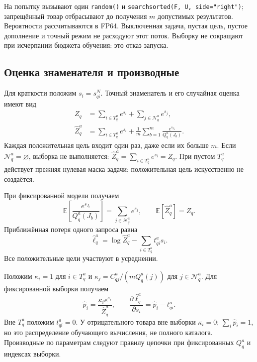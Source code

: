 \documentclass[12pt,a4paper]{article}
\newcommand{\code}[1]{{\ttfamily\small\nolinkurl{#1}}}
\newcommand{\E}{\mathbb E}
\theoremstyle{plainru}
\begin{document}
На попытку вызывают один \code{random()} и
\code{searchsorted(F, U, side="right")};
запрещённый товар отбрасывают до получения $m$ допустимых результатов.
Вероятности рассчитываются в FP64. Выключенная задача, пустая цель,
пустое дополнение и точный режим не расходуют этот поток.
Выборку не сокращают при исчерпании бюджета обучения: это отказ запуска.

\subsection{Оценка знаменателя и производные}
\label{sec:sampled-loss}

Для краткости положим $s_i=s_{qi}^{N}$.
Точный знаменатель и его случайная оценка имеют вид
\begin{align}\label{eq:sampled-normalizer}
Z_q&=\sum_{i\in T_q^a}e^{s_i}
       +\sum_{j\in\mathcal N_q^a}e^{s_j},\\
\widehat Z_q^a&=\sum_{i\in T_q^a}e^{s_i}
       +\frac1m\sum_{b=1}^{m}
        \frac{e^{s_{J_b}}}{Q_q^a(J_b)}.
\nonumber
\end{align}
Каждая положительная цель входит один раз, даже если их больше $m$.
Если $\mathcal N_q^a=\varnothing$, выборка не выполняется:
$\widehat Z_q^a=\sum_{i\in T_q^a}e^{s_i}=Z_q$.
При пустом $T_q^a$ действует прежняя нулевая маска задачи;
положительная цель искусственно не создаётся.

При фиксированной модели получаем
\begin{equation}\label{eq:sampled-unbiased-normalizer}
\E\!\left[\frac{e^{s_{J_b}}}{Q_q^a(J_b)}\right]
=\sum_{j\in\mathcal N_q^a}e^{s_j},
\qquad
\E[\widehat Z_q^a]=Z_q.
\end{equation}
Приближённая потеря одного запроса равна
\begin{equation}\label{eq:sampled-query-loss}
\widehat\ell_q^a
=\log\widehat Z_q^a-\sum_{i\in T_q^a}t_{qi}^a s_i.
\end{equation}
Все положительные цели участвуют в усреднении.

Положим $\kappa_i=1$ для $i\in T_q^a$ и
$\kappa_j=C_{qj}^a/(mQ_q^a(j))$ для $j\in\mathcal N_q^a$.
Для фиксированной выборки получаем
\begin{equation}\label{eq:sampled-gradient}
\widehat p_i=\frac{\kappa_i e^{s_i}}{\widehat Z_q^a},
\qquad
\frac{\partial\widehat\ell_q^a}{\partial s_i}
=\widehat p_i-t_{qi}^a.
\end{equation}
Вне $T_q^a$ положим $t_{qi}^a=0$. У отрицательного товара вне выборки $\kappa_i=0$;
$\sum_i\widehat p_i=1$, но это распределение обучающего вычисления,
не полного каталога. Производные по параметрам следуют правилу цепочки
при фиксированных $Q_q^a$ и индексах выборки.
\end{document}
